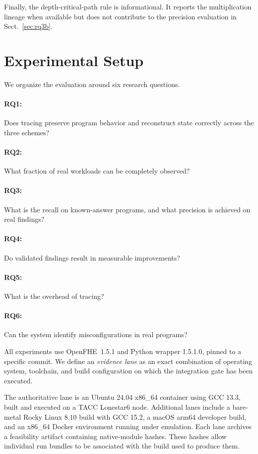 \documentclass[pdflatex,sn-basic,Numbered,iicol]{sn-jnl}
\begin{document}
Finally, the depth-critical-path rule is informational. It reports the
multiplication lineage when available but does not contribute to the
precision evaluation in Sect.~\ref{sec:rq3b}.

\section{Experimental Setup}
\label{sec:setup}

We organize the evaluation around six research questions.

\paragraph{RQ1:} Does tracing preserve program behavior and reconstruct state
correctly across the three schemes?

\paragraph{RQ2:} What fraction of real workloads can be completely observed?

\paragraph{RQ3:} What is the recall on known-answer programs, and what
precision is achieved on real findings?

\paragraph{RQ4:} Do validated findings result in measurable improvements?

\paragraph{RQ5:} What is the overhead of tracing?

\paragraph{RQ6:} Can the system identify misconfigurations in real programs?

\medskip
\noindent All experiments use OpenFHE~1.5.1 and Python wrapper 1.5.1.0, pinned
to a specific commit. We define an \emph{evidence lane} as an exact
combination of operating system, toolchain, and build configuration on which
the integration gate has been executed.

The authoritative lane is an Ubuntu 24.04 x86\_64 container using GCC 13.3,
built and executed on a TACC Lonestar6 node. Additional lanes include a
bare-metal Rocky Linux 8.10 build with GCC 15.2, a macOS arm64 developer
build, and an x86\_64 Docker environment running under emulation. Each lane
archives a feasibility artifact containing native-module hashes. These hashes
allow individual run bundles to be associated with the build used to produce
them.
\end{document}
